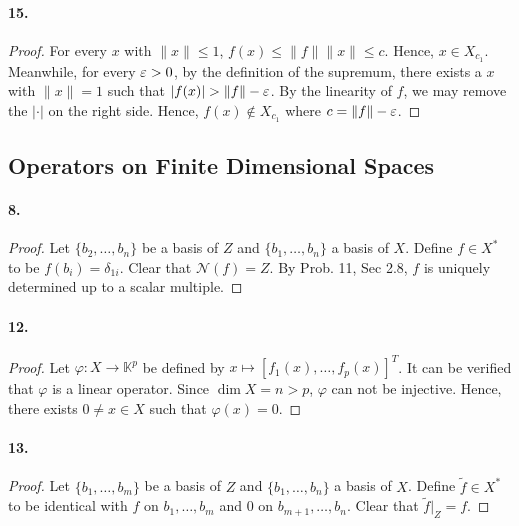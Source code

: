   \paragraph{15.}
  \begin{proof}
    For every $x$ with $\|x\|\le 1$, $f(x)\le \|f\|\|x\|\le c$. Hence, $x\in 
    X_{c_1}$. Meanwhile, for every $\varepsilon>0$, by the definition of the supremum,
    there exists a $x$ with $\|x\|=1$ such that $|f(x)|>\|f\|-\vep$. By the 
    linearity of $f$, we may remove the $|\cdot|$ on the right side. Hence, 
    $f(x)\notin X_{c_1}$ where $c=\|f\|-\varepsilon$.
  \end{proof}

\subsection{Operators on Finite Dimensional Spaces}
  \paragraph{8.}
  \begin{proof}
    Let $\{b_2,\dots,b_n\}$ be a basis of $Z$ and $\{b_1,\dots,b_n\}$ a basis of
    $X$. Define $f\in X^*$ to be $f(b_i)=\delta_{1i}$. Clear that $\mathcal{N}
    (f)=Z$. By Prob. 11, Sec 2.8, $f$ is uniquely determined up to a scalar 
    multiple.
  \end{proof}

  \paragraph{12.}
  \begin{proof}
    Let $\varphi:X\to\mathbb{K}^p$ be defined by $x\mapsto [f_1(x),\dots,
    f_p(x)]^T$. It can be verified that $\varphi$ is a linear operator. Since 
    $\dim X=n>p$, $\varphi$ can not be injective. Hence, there exists $0\ne x\in
    X$ such that $\varphi(x)=0$.
  \end{proof}

  \paragraph{13.}
  \begin{proof}
    Let $\{b_1,\dots,b_m\}$ be a basis of $Z$ and $\{b_1,\dots,b_n\}$ a basis of
    $X$. Define $\tilde{f}\in X^*$ to be identical with $f$ on $b_1,\dots,b_m$
    and $0$ on $b_{m+1},\dots,b_n$. Clear that $\tilde{f}|_Z=f$.
  \end{proof}
